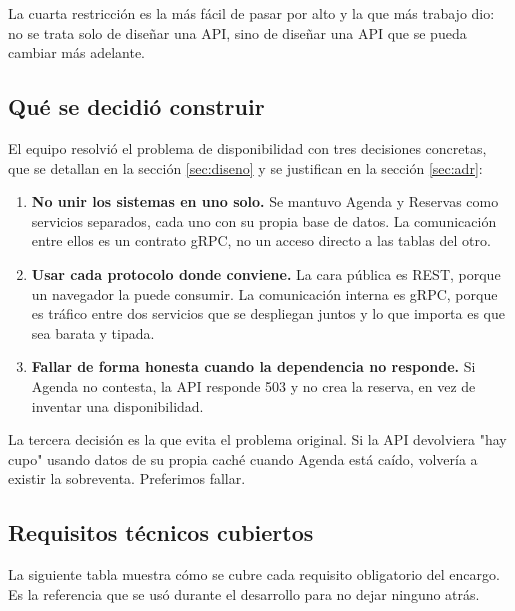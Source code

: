 \documentclass[12pt, a4paper]{article}
\begin{document}
La cuarta restricción es la más fácil de pasar por alto y la que más
trabajo dio: no se trata solo de diseñar una API, sino de diseñar una
API que se pueda cambiar más adelante.

\subsection{Qué se decidió construir}

El equipo resolvió el problema de disponibilidad con tres decisiones
concretas, que se detallan en la sección \ref{sec:diseno} y se justifican
en la sección \ref{sec:adr}:

\begin{enumerate}[leftmargin=1.7cm]
    \item \textbf{No unir los sistemas en uno solo.} Se mantuvo Agenda y
    Reservas como servicios separados, cada uno con su propia base de
    datos. La comunicación entre ellos es un contrato gRPC, no un acceso
    directo a las tablas del otro.
    \item \textbf{Usar cada protocolo donde conviene.} La cara pública es
    REST, porque un navegador la puede consumir. La comunicación interna es
    gRPC, porque es tráfico entre dos servicios que se despliegan juntos y
    lo que importa es que sea barata y tipada.
    \item \textbf{Fallar de forma honesta cuando la dependencia no
    responde.} Si Agenda no contesta, la API responde 503 y no crea la
    reserva, en vez de inventar una disponibilidad.
\end{enumerate}

La tercera decisión es la que evita el problema original. Si la API
devolviera "hay cupo" usando datos de su propia caché cuando Agenda está
caído, volvería a existir la sobreventa. Preferimos fallar.

\subsection{Requisitos técnicos cubiertos}

La siguiente tabla muestra cómo se cubre cada requisito obligatorio del
encargo. Es la referencia que se usó durante el desarrollo para no dejar
ninguno atrás.
\end{document}
